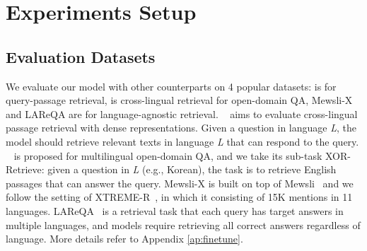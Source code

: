
\section{Experiments Setup}


\subsection{Evaluation Datasets}

We evaluate our model with other counterparts on 4 popular datasets: \tydi is for query-passage retrieval, \xor is cross-lingual retrieval for open-domain QA, Mewsli-X and LAReQA are for language-agnostic retrieval. 
\tydi~\citep{zhang-etal-2021-mr} aims to evaluate cross-lingual passage retrieval with dense representations. Given a question in language \textit{L}, the model should retrieve relevant texts in language \textit{L} that can respond to the query. 
\xor~\citep{asai-etal-2021-xor} is proposed for multilingual open-domain QA, and we take its sub-task XOR-Retrieve: given a question in \textit{L} (e.g., Korean), the task is to retrieve English passages that can answer the query. 
Mewsli-X is built on top of Mewsli~\citep{botha-etal-2020-entity} and we follow the setting of XTREME-R~\citep{ruder-etal-2021-xtreme}, in which it consisting of 15K mentions in 11 languages. 
LAReQA~\citep{roy-etal-2020-lareqa} is a retrieval task that each query has target answers in multiple languages, and models require retrieving all correct answers regardless of language. 
More details refer to Appendix \ref{ap:finetune}.







